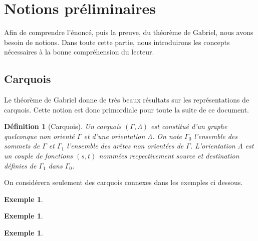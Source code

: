 \documentclass[a4paper,10pt]{article}
\newtheorem{defi}[]{Définition}[section]
\newtheorem{ex}[]{Exemple}[section]
\begin{document}
\section{Notions préliminaires}
Afin de comprendre l'énoncé, puis la preuve, du théorème de Gabriel, nous avons besoin de notions. Dans toute cette partie, nous introduirons les concepts nécessaires à la bonne compréhension du lecteur.

\subsection{Carquois}
Le théorème de Gabriel donne de très beaux résultats sur les représentations de carquois. Cette notion est donc primordiale pour toute la suite de ce document.
\begin{defi}[Carquois]
	\label{carquois}
	Un \emph{carquois} $(\Gamma,\Lambda)$ est constitué d'un graphe quelconque non orienté $\Gamma$ et d'une orientation $\Lambda$. On note  $\Gamma_0$ l'ensemble des sommets de $\Gamma$ et $\Gamma_1$ l'ensemble des arêtes non orientées de $\Gamma$. L'orientation $\Lambda$ est un couple de fonctions $(s,t)$ nommées recpectivement source et destination définies de $\Gamma_1$ dans $\Gamma_0$. 
\end{defi}
On considérera seulement des carquois connexes dans les exemples ci dessous.
	\begin{ex}
	\end{ex}
	\begin{ex}
	\end{ex}
	\begin{ex}
	\end{ex}
\end{document}
